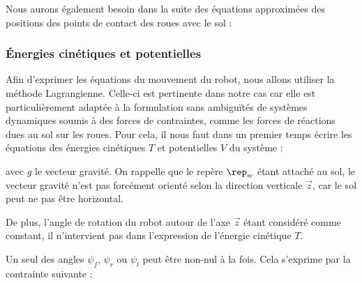 					Nous aurons également besoin dans la suite des équations approximées des positions des points de contact des roues avec le sol :

			
			\subsubsection{Énergies cinétiques et potentielles}
			
				\label{section.contrainte_basculement}
				
					Afin d'exprimer les équations du mouvement du robot, nous allons utiliser la méthode Lagrangienne.
					Celle-ci est pertinente dans notre cas car elle est particulièrement adaptée à la formulation sans ambiguïtés de systèmes dynamiques soumis à des forces de contraintes, comme les forces de réactions dues au sol sur les roues. 
					Pour cela, il nous faut dans un premier temps écrire les équations des énergies cinétiques $T$ et potentielles $V$ du système :
					
					avec $g$ le vecteur gravité. On rappelle que le repère $\rep_w$ étant attaché au sol, le vecteur gravité n'est pas forcément orienté selon la direction verticale $\vec{z}$, car le sol peut ne pas être horizontal.
					
					De plus, l'angle de rotation du robot autour de l'axe $\vec{z}$ étant considéré comme constant, il n'intervient pas dans l'expression de l’énergie cinétique $T$. 
					
					Un seul des angles $\psi_f$, $\psi_r$ ou $\psi_l$ peut être non-nul à la fois. Cela s'exprime par la contrainte suivante :
					
				
